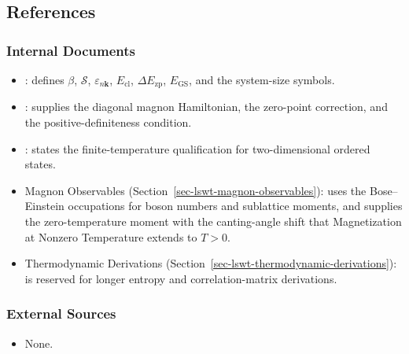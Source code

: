 \subsection{References}

\subsubsection{Internal Documents}

\begin{itemize}
\tightlist
\item
  : defines \(\beta\), \(\mathcal S\), \(\varepsilon_{n\mathbf k}\), \(E_{\mathrm{cl}}\), \(\Delta E_{\mathrm{zp}}\), \(E_{\mathrm{GS}}\), and the system-size symbols.
\item
  : supplies the diagonal magnon Hamiltonian, the zero-point correction, and the positive-definiteness condition.
\item
  : states the finite-temperature qualification for two-dimensional ordered states.
\item
  Magnon Observables (Section~\ref{sec-lswt-magnon-observables}): uses the Bose--Einstein occupations for boson numbers and sublattice moments, and supplies the zero-temperature moment with the canting-angle shift that Magnetization at Nonzero Temperature extends to \(T>0\).
\item
  Thermodynamic Derivations (Section~\ref{sec-lswt-thermodynamic-derivations}): is reserved for longer entropy and correlation-matrix derivations.
\end{itemize}

\subsubsection{External Sources}

\begin{itemize}
\tightlist
\item
  None.
\end{itemize}
